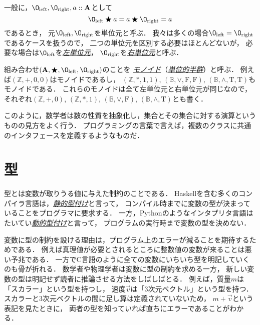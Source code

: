 \documentclass[a5paper,draft]{jsbook}
\newcommand{\programminglanguage}[1]{\textsf{#1}}
\newcommand{\clang}{\programminglanguage{C}}
\newcommand{\haskell}{\programminglanguage{Haskell}}
\newcommand{\python}{\programminglanguage{Python}}
\newcommand{\keyword}[1]{{\underline{\emph{#1}}}}
\newcommand{\mathConstant}[1]{\mathrm{#1}} %
\newcommand{\mathSub}[1]{\textrm{#1}}
\newcommand{\mathSet}[1]{\mathbf{#1}} %
\newcommand{\mathSpecialSet}[1]{\mathbb{#1}} %
\newcommand{\mathVectorVar}[1]{\vec{#1}}
\newcommand{\mathTupleWith}[1]{\left(#1\right)}
\newcommand{\mathTrue}{\mathConstant{T}}
\newcommand{\mathFalse}{\mathConstant{F}}
\newcommand{\mathId}{\O}
\newcommand{\mathLeft}{\mathSub{left}}
\newcommand{\mathRight}{\mathSub{right}}
\newcommand{\mathAnyBinaryOperator}{\mathbin{\bigstar}}
\newcommand{\mathIn}{\mathrel{::}}
\begin{document}
一般に，$\mathId_\mathLeft,\mathId_\mathRight,a\mathIn\mathSet{A}$として
\begin{equation}
\label{eq:identity}
\mathId_\mathLeft\mathAnyBinaryOperator a=a\mathAnyBinaryOperator\mathId_\mathRight=a
\end{equation}
であるとき，
元$\mathId_\mathLeft,\mathId_\mathRight$を単位元と呼ぶ．
我々は多くの場合$\mathId_\mathLeft=\mathId_\mathRight$であるケースを扱うので，
二つの単位元を区別する必要はほとんどないが，
必要な場合は$\mathId_\mathLeft$を\keyword{左単位元}，
$\mathId_\mathRight$を\keyword{右単位元}と呼ぶ．

組み合わせ$\mathTupleWith{\mathSet{A},\mathAnyBinaryOperator,\mathId_\mathLeft,\mathId_\mathRight}$のことを
\keyword{モノイド}（\keyword{単位的半群}）と呼ぶ．
例えば$\mathTupleWith{\mathSpecialSet{Z},+,0,0}$はモノイドであるし，
$\mathTupleWith{\mathSpecialSet{Z},*,1,1}$,
$\mathTupleWith{\mathSpecialSet{B},\vee,\mathFalse,\mathFalse}$,
$\mathTupleWith{\mathSpecialSet{B},\wedge,\mathTrue,\mathTrue}$もモノイドである．
これらのモノイドは全て左単位元と右単位元が同じなので，
それぞれ$\mathTupleWith{\mathSpecialSet{Z},+,0}$,
$\mathTupleWith{\mathSpecialSet{Z},*,1}$,
$\mathTupleWith{\mathSpecialSet{B},\vee,\mathFalse}$,
$\mathTupleWith{\mathSpecialSet{B},\wedge,\mathTrue}$とも書く．

このように，数学者は数の性質を抽象化し，集合とその集合に対する演算というものの見方をよく行う．
プログラミングの言葉で言えば，複数のクラスに共通のインタフェースを定義するようなものだ．

\section{型}

型とは変数が取りうる値に与えた制約のことである．
\haskell を含む多くのコンパイラ言語は，\keyword{静的型付け}と言って，
コンパイル時までに変数の型が決まっていることをプログラマに要求する．
一方，\python のようなインタプリタ言語はたいてい\keyword{動的型付け}と言って，
プログラムの実行時まで変数の型を決めない．

変数に型の制約を設ける理由は，プログラム上のエラーが減ることを期待するためである．
例えば真理値が必要とされるところに整数値の変数が来ることは悪い予兆である．
一方で\clang 言語のように全ての変数にいちいち型を明記していくのも骨が折れる．
数学者や物理学者は変数に型の制約を求める一方，
新しい変数の型は明記せず読者に推論させる方法をしばしばとる．
例えば，質量$m$は「スカラー」という型を持つし，
速度$\mathVectorVar{v}$は「3次元ベクトル」という型を持つ．
スカラーと3次元ベクトルの間に足し算は定義されていないため，
$m+\mathVectorVar{v}$という表記を見たときに，
両者の型を知っていれば直ちにエラーであることがわかる．
\end{document}
